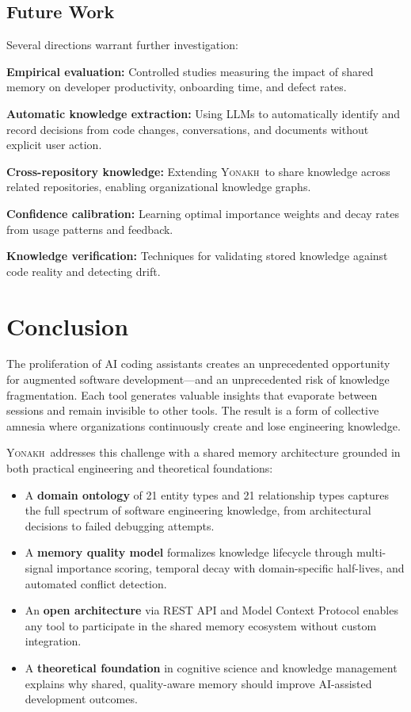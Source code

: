 \documentclass[10pt,journal,compsoc]{IEEEtran}
\newcommand{\yonakh}{\textsc{Yonakh}}
\begin{document}
\subsection{Future Work}

Several directions warrant further investigation:

\textbf{Empirical evaluation:} Controlled studies measuring the impact of shared memory on developer productivity, onboarding time, and defect rates.

\textbf{Automatic knowledge extraction:} Using LLMs to automatically identify and record decisions from code changes, conversations, and documents without explicit user action.

\textbf{Cross-repository knowledge:} Extending \yonakh\ to share knowledge across related repositories, enabling organizational knowledge graphs.

\textbf{Confidence calibration:} Learning optimal importance weights and decay rates from usage patterns and feedback.

\textbf{Knowledge verification:} Techniques for validating stored knowledge against code reality and detecting drift.

\section{Conclusion}

The proliferation of AI coding assistants creates an unprecedented opportunity for augmented software development---and an unprecedented risk of knowledge fragmentation. Each tool generates valuable insights that evaporate between sessions and remain invisible to other tools. The result is a form of collective amnesia where organizations continuously create and lose engineering knowledge.

\yonakh\ addresses this challenge with a shared memory architecture grounded in both practical engineering and theoretical foundations:

\begin{itemize}
\item A \textbf{domain ontology} of 21 entity types and 21 relationship types captures the full spectrum of software engineering knowledge, from architectural decisions to failed debugging attempts.

\item A \textbf{memory quality model} formalizes knowledge lifecycle through multi-signal importance scoring, temporal decay with domain-specific half-lives, and automated conflict detection.

\item An \textbf{open architecture} via REST API and Model Context Protocol enables any tool to participate in the shared memory ecosystem without custom integration.

\item A \textbf{theoretical foundation} in cognitive science and knowledge management explains why shared, quality-aware memory should improve AI-assisted development outcomes.
\end{itemize}
\end{document}
